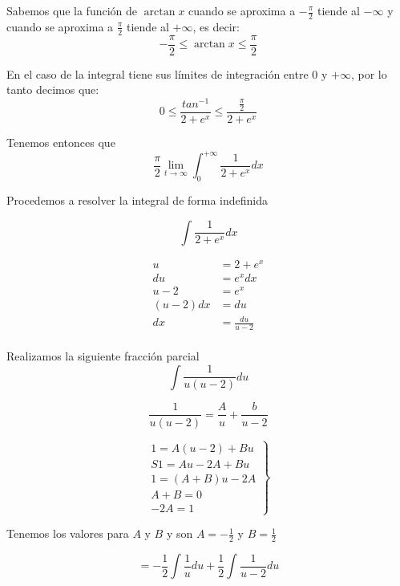 \documentclass[12pt]{article}
\begin{document}
\begin{flushleft}
Sabemos que la función de $\arctan{x}$ cuando se aproxima a $-\frac{\pi}{2}$ tiende al $-\infty$ y cuando se aproxima a $\frac{\pi}{2}$ tiende al $+\infty$, es decir:\\



$$-\frac{\pi}{2}\leq \arctan{x}\leq \frac{\pi}{2}$$

En el caso de la integral tiene sus límites de integración entre $0$ y $+\infty$, por lo tanto decimos que:\\

$$0\leq \frac{tan^{-1}}{2+e^{x}}\leq \frac{\frac{\pi}{2}}{2+e^{x}}$$

Tenemos entonces que\\


$$\frac{\pi}{2}\lim_{t \to \infty }\int_{0}^{+\infty}\frac{1}{2+e^{x}}dx$$

Procedemos a resolver la integral de forma indefinida 


$$\int \frac{1}{2+e^{x}}dx$$

\begin{align*}
    u& = 2+e^{x}\\
    du& = e^xdx\\
    u-2& = e^x\\
    (u-2)dx& = du\\
    dx&=\frac{du}{u-2}\\
\end{align*}

Realizamos la siguiente fracción parcial\\

$$\int \frac{1}{u(u-2)}du$$

$$\frac{1}{u(u-2)}=\frac{A}{u}+\frac{b}{u-2}$$

$$\left.\begin{matrix}
    1 = A(u-2)+Bu\\S
    1=Au-2A+Bu\\
1 = (A+B)u - 2A\\
A+B=0\\
-2A=1
\end{matrix}\right\}$$



Tenemos los valores para $A$ y $B$ y son $A=-\frac{1}{2}$ y $B=\frac{1}{2}$




\begin{flushleft}
    $$=-\frac{1}{2} \int \frac{1}{u}du + \frac{1}{2}\int \frac{1}{u-2}du$$
\end{flushleft}




\end{flushleft}
\end{document}
